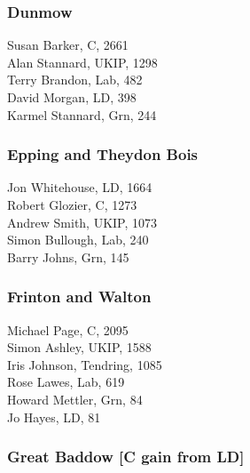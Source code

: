 \documentclass[a4paper,openany,10pt]{book}
\begin{document}
\subsubsection*{Dunmow}



Susan Barker, C, 2661\\
Alan Stannard, UKIP, 1298\\
Terry Brandon, Lab, 482\\
David Morgan, LD, 398\\
Karmel Stannard, Grn, 244\\


\subsubsection*{Epping and Theydon Bois}



Jon Whitehouse, LD, 1664\\
Robert Glozier, C, 1273\\
Andrew Smith, UKIP, 1073\\
Simon Bullough, Lab, 240\\
Barry Johns, Grn, 145\\


\subsubsection*{Frinton and Walton}



Michael Page, C, 2095\\
Simon Ashley, UKIP, 1588\\
Iris Johnson, Tendring, 1085\\
Rose Lawes, Lab, 619\\
Howard Mettler, Grn, 84\\
Jo Hayes, LD, 81\\


\subsubsection*{Great Baddow \hspace*{\fill}\nolinebreak[1]%
\enspace\hspace*{\fill}
[C gain from LD]}
\end{document}
